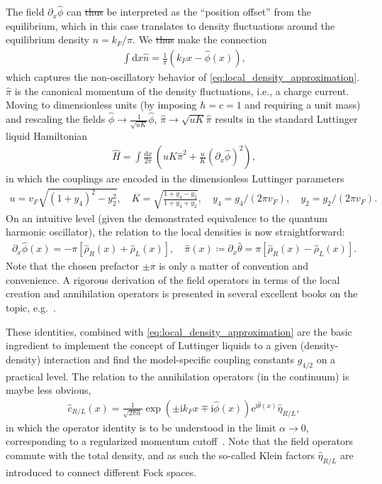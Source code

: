\documentclass{svmono}
\def\ri{\mathrm i}
\def\re{\mathrm e}
\def\rd{\mathrm d}
\newcommand{\brlr}[1]{\left( #1 \right)}
\providecommand{\DIFdeltex}[1]{{\protect\color{red}\sout{#1}}}                      %
\providecommand{\DIFdelbegin}{} %
\providecommand{\DIFdelend}{} %
\providecommand{\DIFdel}[1]{\texorpdfstring{\DIFdeltex{#1}}{}} %
\newcommand{\DIFscaledelfig}{0.5}
\newlength{\DIFdelgraphicswidth} %
\newlength{\DIFdelgraphicsheight} %
\newcommand{\DIFdelincludegraphics}[2][]{%
\sbox{\DIFdelgraphicsbox}{\DIFOincludegraphics[#1]{#2}}%
\settoboxwidth{\DIFdelgraphicswidth}{\DIFdelgraphicsbox} %
\settoboxtotalheight{\DIFdelgraphicsheight}{\DIFdelgraphicsbox} %
\scalebox{\DIFscaledelfig}{%
\parbox[b]{\DIFdelgraphicswidth}{\usebox{\DIFdelgraphicsbox}\\[-\baselineskip] \rule{\DIFdelgraphicswidth}{0em}}\llap{\resizebox{\DIFdelgraphicswidth}{\DIFdelgraphicsheight}{%
\setlength{\unitlength}{\DIFdelgraphicswidth}%
\begin{picture}(1,1)%
\thicklines\linethickness{2pt} %
{\color[rgb]{1,0,0}\put(0,0){\framebox(1,1){}}}%
{\color[rgb]{1,0,0}\put(0,0){\line( 1,1){1}}}%
{\color[rgb]{1,0,0}\put(0,1){\line(1,-1){1}}}%
\end{picture}%
}\hspace*{3pt}}} %
} %
\DeclareRobustCommand{\DIFdelbegin}{\DIFOdelbegin \let\includegraphics\DIFdelincludegraphics} %
\DeclareRobustCommand{\DIFdelend}{\DIFOaddend \let\includegraphics\DIFOincludegraphics} %
\begin{document}
The field $\partial_x\hat\phi$ can \DIFdelbegin \DIFdel{thus }\DIFdelend be interpreted as the ``position offset'' from the equilibrium, which in this case translates to density fluctuations around the equilibrium density $n=k_F/\pi$.
We \DIFdelbegin \DIFdel{thus }\DIFdelend make the connection
\begin{align}
    \int\rd x\hat n = \frac1\pi\brlr{k_Fx - \hat\phi(x)},
\end{align}
which captures the non-oscillatory behavior of \cref{eq:local_density_approximation}.
$\hat\pi$ is the canonical momentum of the density fluctuations, i.e., a charge current.
Moving to dimensionless units (by imposing $\hbar=c=1$ and requiring a unit mass) and rescaling the fields $\hat\phi\rightarrow \frac1{\sqrt{uK}}\hat\phi$, $\hat\pi\rightarrow \sqrt{uK}\hat\pi$ results in the standard Luttinger liquid Hamiltonian
\begin{align}
    \hat H = \int\frac{\rd x}{2\pi}\, \brlr{uK\hat\pi^2 + \frac uK(\partial_x\hat\phi)^2},
    \label{eq:ll_hamiltonian}
\end{align}
in which the couplings are encoded in the dimensionless Luttinger parameters
\begin{align}
    u = v_F\sqrt{\brlr{1 + y_4}^2 - y_2^2},
    \quad
    K = \sqrt{\frac{1+y_4-y_2}{1+y_4+y_2}},
    \quad
    y_4=g_4/(2\pi v_F),
    \quad
    y_2=g_2/(2\pi v_F).
\end{align}
On an intuitive level (given the demonstrated equivalence to the quantum harmonic oscillator), the relation to the local densities is now straightforward:
\begin{align}
    \partial_x\hat\phi(x)=-\pi[\hat\rho_R(x)+\hat\rho_L(x)],
    \quad
    \hat\pi(x)\coloneqq\partial_x\hat\theta=\pi[\hat\rho_R(x)-\hat\rho_L(x)].
\end{align}
Note that the chosen prefactor $\pm\pi$ is only a matter of convention and convenience.
A rigorous derivation of the field operators in terms of the local creation and annihilation operators is presented in several excellent books on the topic, e.g.~\cite{Bruus2004,Giamarchi2003,Gogolin2004}.

These identities, combined with \cref{eq:local_density_approximation} are the basic ingredient to implement the concept of Luttinger liquids to a given (density-density) interaction and find the model-specific coupling constants $g_{4/2}$ on a practical level.
The relation to the annihilation operators (in the continuum) is maybe less obvious,
\begin{align}
    \hat c_{R/L}(x) = \frac1{\sqrt{2\pi\alpha}}\exp\brlr{\pm\ri k_F x\mp\ri\hat \phi(x)}\re^{\ri\hat\theta(x)}\hat \eta_{R/L},
    \label{eq:bosonization_identity}
\end{align}
in which the operator identity is to be understood in the limit $\alpha\rightarrow0$, corresponding to a regularized momentum cutoff~\cite{Bruus2004}.
Note that the field operators commute with the total density, and as such the so-called Klein factors $\hat\eta_{R/L}$ are introduced to connect different Fock spaces.
\end{document}
